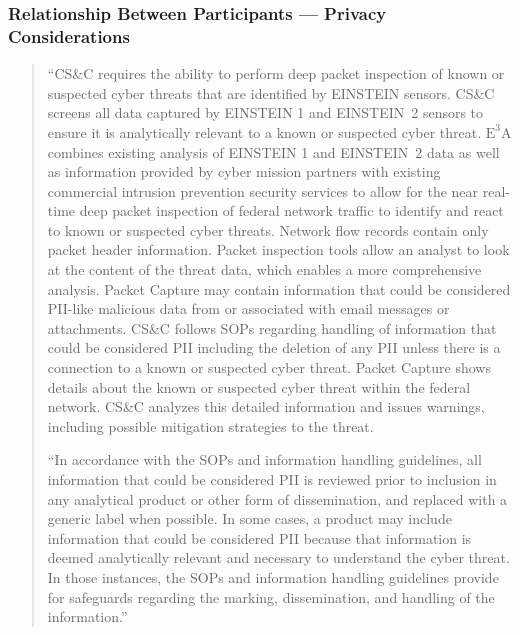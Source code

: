 \documentclass[fleqn,12pt]{wlscirep}
\newcommand{\ETA}{$\textrm{E}^\textrm{3}\textrm{A}$\xspace}
\begin{document}
\subsubsection{Relationship Between Participants --- Privacy Considerations}\label{excerpt1}
\begin{quote}
  ``CS\&C requires the ability to perform deep packet inspection of known or
suspected cyber threats that are identified by EINSTEIN sensors. CS\&C screens all data
captured by EINSTEIN 1 and EINSTEIN~2 sensors to ensure it is analytically relevant to
a known or suspected cyber threat. \ETA combines existing analysis of EINSTEIN 1 and
EINSTEIN~2 data as well as information provided by cyber mission partners with
existing commercial intrusion prevention security services to allow for the near real-time
deep packet inspection of federal network traffic to identify and react to known or
suspected cyber threats. Network flow records contain only packet header information.
Packet inspection tools allow an analyst to look at the content of the threat data, which
enables a more comprehensive analysis. Packet Capture may contain information that
could be considered PII-like malicious data from or associated with email messages or
attachments. CS\&C follows SOPs regarding handling of information that could be
considered PII including the deletion of any PII unless there is a connection to a known
or suspected cyber threat. Packet Capture shows details about the known or suspected
cyber threat within the federal network. CS\&C analyzes this detailed information and
issues warnings, including possible mitigation strategies to the threat.

  ``In accordance with the SOPs and information handling guidelines, all information
that could be considered PII is reviewed prior to inclusion in any analytical product or
other form of dissemination, and replaced with a generic label when possible. In some
cases, a product may include information that could be considered PII because that
information is deemed analytically relevant and necessary to understand the cyber threat.
In those instances, the SOPs and information handling guidelines provide for safeguards
regarding the marking, dissemination, and handling of the
information.''~\cite[p.9]{dhs-e3a-pia}
\end{quote}
\end{document}
